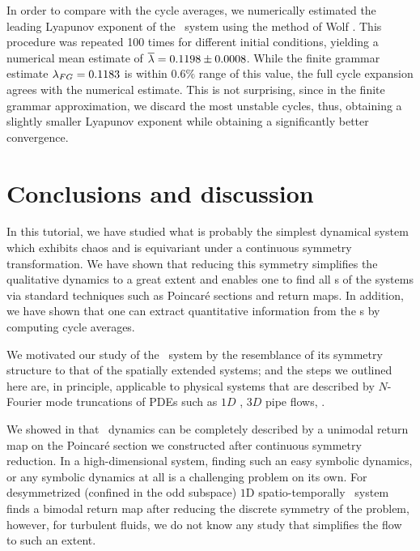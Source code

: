 \documentclass[aip,cha,
reprint,
secnumarabic,
nofootinbib, tightenlines,
nobibnotes, showkeys, showpacs,
superscriptaddress,
]{revtex4-1}
\begin{document}
{In order to compare with the cycle averages, we numerically 
estimated the leading Lyapunov exponent of the \twomode\ system 
using the method of Wolf \etal{}. This procedure 
was repeated 100 times for different initial conditions, yielding 
a numerical mean estimate of $\overline{\lambda} = 0.1198 \pm 0.0008$. 
While the finite grammar estimate $\lambda_{FG} = 0.1183$ is within 
$0.6\%$ range of this value, the full cycle expansion agrees with the 
numerical estimate. This is not surprising, since in the finite 
grammar approximation, we discard the most unstable cycles, thus, 
obtaining a slightly smaller Lyapunov exponent while obtaining a 
significantly better convergence.

\section{Conclusions and discussion}
\label{s:concl}

In this tutorial, we have studied what is probably the simplest 
dynamical system which exhibits chaos and is equivariant under a 
continuous symmetry transformation. We have shown that reducing 
this symmetry simplifies the qualitative dynamics to a great 
extent and enables one to find all \rpo s of the systems via 
standard techniques such as Poincar\'e sections and return maps. 
In addition, we have shown that one can extract quantitative 
information from the \rpo s by computing cycle averages.

We motivated our study of the \twomode\ system by the resemblance 
of its symmetry structure to that of the spatially extended 
systems; and the steps we outlined here are, in principle, 
applicable to physical systems that are described by $N$-Fourier 
mode truncations of PDEs such as $1D$ \KS{}, $3D$ pipe 
flows, \etc.

We showed in  that \twomode\ dynamics can be 
completely described by a unimodal return map on the Poincar\'e 
section we constructed after continuous symmetry reduction. In a 
high-dimensional system, finding such an easy symbolic dynamics, 
or any symbolic dynamics at all is a challenging problem on its 
own. For desymmetrized (confined in the odd subspace) $1$D 
spatio-temporally \KS\ system  finds a bimodal 
return map after reducing the discrete symmetry of the problem, 
however, for turbulent fluids, we do not know any study that 
simplifies the flow to such an extent.

}
\end{document}
